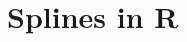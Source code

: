 \documentclass[aspectratio=169]{beamer}
\begin{document}

\section{Splines in R}





\end{document}
